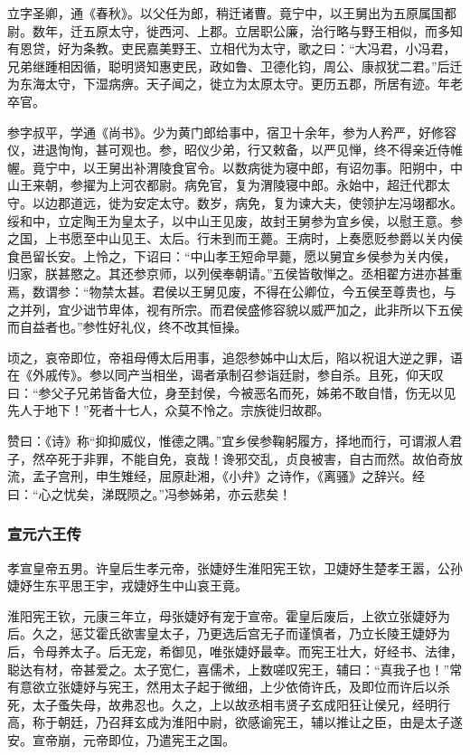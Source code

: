 \documentclass[]{article}
\begin{document}
立字圣卿，通《春秋》。以父任为郎，稍迁诸曹。竟宁中，以王舅出为五原属国都尉。数年，迁五原太守，徙西河、上郡。立居职公廉，治行略与野王相似，而多知有恩贷，好为条教。吏民嘉美野王、立相代为太守，歌之曰：``大冯君，小冯君，兄弟继踵相因循，聪明贤知惠吏民，政如鲁、卫德化钧，周公、康叔犹二君。''后迁为东海太守，下湿病痹。天子闻之，徙立为太原太守。更历五郡，所居有迹。年老卒官。

参字叔平，学通《尚书》。少为黄门郎给事中，宿卫十余年，参为人矜严，好修容仪，进退恂恂，甚可观也。参，昭仪少弟，行又敕备，以严见惮，终不得亲近侍帷幄。竟宁中，以王舅出补渭陵食官令。以数病徙为寝中郎，有诏勿事。阳朔中，中山王来朝，参擢为上河农都尉。病免官，复为渭陵寝中郎。永始中，超迁代郡太守。以边郡道远，徙为安定太守。数岁，病免，复为谏大夫，使领护左冯翊都水。绥和中，立定陶王为皇太子，以中山王见废，故封王舅参为宜乡侯，以慰王意。参之国，上书愿至中山见王、太后。行未到而王薨。王病时，上奏愿贬参爵以关内侯食邑留长安。上怜之，下诏曰：``中山孝王短命早薨，愿以舅宜乡侯参为关内侯，归家，朕甚愍之。其还参京师，以列侯奉朝请。''五侯皆敬惮之。丞相翟方进亦甚重焉，数谓参：``物禁太甚。君侯以王舅见废，不得在公卿位，今五侯至尊贵也，与之并列，宜少诎节卑体，视有所宗。而君侯盛修容貌以威严加之，此非所以下五侯而自益者也。''参性好礼仪，终不改其恒操。

顷之，哀帝即位，帝祖母傅太后用事，追怨参姊中山太后，陷以祝诅大逆之罪，语在《外戚传》。参以同产当相坐，谒者承制召参诣廷尉，参自杀。且死，仰天叹曰：``参父子兄弟皆备大位，身至封侯，今被恶名而死，姊弟不敢自惜，伤无以见先人于地下！''死者十七人，众莫不怜之。宗族徙归故郡。

赞曰：《诗》称``抑抑威仪，惟德之隅。''宜乡侯参鞠躬履方，择地而行，可谓淑人君子，然卒死于非罪，不能自免，哀哉！谗邪交乱，贞良被害，自古而然。故伯奇放流，孟子宫刑，申生雉经，屈原赴湘，《小弁》之诗作，《离骚》之辞兴。经曰：``心之忧矣，涕既陨之。''冯参姊弟，亦云悲矣！

\hypertarget{header-n5568}{%
\subsubsection{宣元六王传}\label{header-n5568}}

孝宣皇帝五男。许皇后生孝元帝，张婕妤生淮阳宪王钦，卫婕妤生楚孝王嚣，公孙婕妤生东平思王宇，戎婕妤生中山哀王竟。

淮阳宪王钦，元康三年立，母张婕妤有宠于宣帝。霍皇后废后，上欲立张婕妤为后。久之，惩艾霍氏欲害皇太子，乃更选后宫无子而谨慎者，乃立长陵王婕妤为后，令母养太子。后无宠，希御见，唯张婕妤最幸。而宪王壮大，好经书、法律，聪达有材，帝甚爱之。太子宽仁，喜儒术，上数嗟叹宪王，辅曰：``真我子也！''常有意欲立张婕妤与宪王，然用太子起于微细，上少依倚许氏，及即位而许后以杀死，太子蚤失母，故弗忍也。久之，上以故丞相韦贤子玄成阳狂让侯兄，经明行高，称于朝廷，乃召拜玄成为淮阳中尉，欲感谕宪王，辅以推让之臣，由是太子遂安。宣帝崩，元帝即位，乃遣宪王之国。
\end{document}
